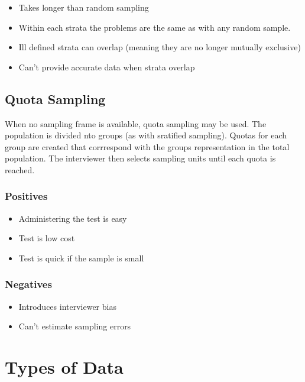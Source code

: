 \documentclass{article}
\begin{document}
\begin{itemize}

    \item Takes longer than random sampling
    \item Within each strata the problems are the same as with any random sample.
    \item Ill defined strata can overlap (meaning they are no longer mutually exclusive)
    \item Can't provide accurate data when strata overlap
    
\end{itemize}

\subsection{Quota Sampling}

When no sampling frame is available, quota sampling may be used. The population is divided nto groups (as with sratified sampling). Quotas for each group are created that corrrespond with the groups representation in the total population. The interviewer then selects sampling units until each quota is reached.

\subsubsection{Positives}

\begin{itemize}

    \item Administering the test is easy
    \item Test is low cost
    \item Test is quick if the sample is small
    
\end{itemize}

\subsubsection{Negatives}

\begin{itemize}

    \item Introduces interviewer bias
    \item Can't estimate sampling errors
    
\end{itemize}

\section{Types of Data}
\end{document}
